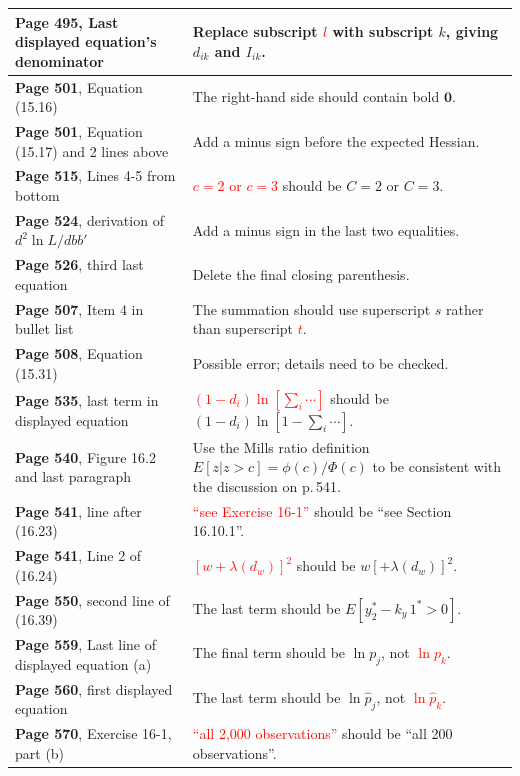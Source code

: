 \documentclass[10pt, a4paper]{article}
\newcommand{\red}[1]{\textcolor{red}{#1}}
\newcommand{\green}[1]{\textcolor{green!50!black}{#1}}
\begin{document}
\begin{longtable}{|R{.41\textwidth}|R{.57\textwidth}|}
	\textbf{Page 495}, Last displayed equation's denominator\hfill{} & Replace subscript \red{$l$} with subscript \green{$k$}, giving \green{$d_{ik}$} and \green{$I_{ik}$}. \\ \hline
	\textbf{Page 501}, Equation (15.16) \hfill {} & The right-hand side should contain bold \green{$\mathbf{0}$}. \\ \hline
	\textbf{Page 501}, Equation (15.17) and 2 lines above & Add a minus sign before the expected Hessian. \\ \hline
	\textbf{Page 515}, Lines 4-5 from bottom & \red{$c=2$ or $c=3$} should be \green{$C=2$ or $C=3$}. \\ \hline
	\textbf{Page 524}, derivation of $d^2\ln L/dbb'$ & Add a minus sign in the last two equalities. \\ \hline
	\textbf{Page 526}, third last equation & Delete the final closing parenthesis. \\ \hline
	\textbf{Page 507}, Item 4 in bullet list \hfill {} & The summation should use superscript \green{$s$} rather than superscript \red{$t$}. \\ \hline
	\textbf{Page 508}, Equation (15.31) & Possible error; details need to be checked. \\ \hline
	\textbf{Page 535}, last term in displayed equation \hfill {} & \red{$(1-d_i)\ln[\sum_i \cdots]$} should be \green{$(1-d_i)\ln[1-\sum_i \cdots]$}. \\ \hline
	\textbf{Page 540}, Figure 16.2 and last paragraph & Use the Mills ratio definition \green{$E[z|z>c]=\phi(c)/\Phi(c)$} to be consistent with the discussion on p.\,541. \\ \hline
	\textbf{Page 541}, line after (16.23) & \red{``see Exercise 16-1''} should be \green{``see Section 16.10.1''}. \\ \hline
	\textbf{Page 541}, Line 2 of (16.24) \hfill {} & \red{$[w+\lambda(d_w)]^2$} should be \green{$w[+\lambda(d_w)]^2$}. \\ \hline
	\textbf{Page 550}, second line of (16.39) & The last term should be \green{$E[y_2^*-k_y\,1^*>0]$}. \\ \hline
	\textbf{Page 559}, Last line of displayed equation (a) & The final term should be \green{$\ln p_j$}, not \red{$\ln p_k$}. \\ \hline
	\textbf{Page 560}, first displayed equation & The last term should be \green{$\ln \widehat p_j$}, not \red{$\ln \widehat p_k$}. \\ \hline
	\textbf{Page 570}, Exercise 16-1, part (b) & \red{``all 2,000 observations''} should be \green{``all 200 observations''}. \\ \hline

\end{longtable}
\end{document}
